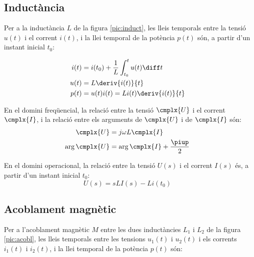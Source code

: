 \subsection{Inductància} 

Per a la inductància $L$ de la figura \vref{pic:induct},
les lleis temporals entre la tensió $u(t)$ i el corrent $i(t)$, i la llei temporal
de la potència $p(t)$ són,  a partir d'un instant inicial $t_0$:

\hfill
\begin{minipage}[b]{5cm}
	
	\label{pic:induct}
\end{minipage}
\hfill
\begin{minipage}[b][3.8cm][t]{8cm}
	\begin{align}
		i(t) &= i(t_0) + \frac{1}{L} \int_{t_0}^t u(t) \diff t \\
		u(t) &= L \deriv{i(t)}{t} \\
		p(t) &= u(t) i(t) = L i(t) \deriv{i(t)}{t}
	\end{align}
\end{minipage}

En el domini freqüencial, la relació entre la tensió $\cmplx{U}$ i el corrent $\cmplx{I}$, i la relació entre els arguments de $\cmplx{U}$ i de $\cmplx{I}$  són:
\begin{align}
	\cmplx{U} &= j \omega L \cmplx{I} \\
	\arg{\cmplx{U}} &= \arg{\cmplx{I}} + \frac{\piup}{2}
\end{align}

 En el domini operacional, la relació entre la tensió $U(s)$ i el corrent $I(s)$ és, a partir d'un instant inicial $t_0$:
\begin{equation}
	U(s) = s L I(s) - L i(t_0)
\end{equation}


\subsection{Acoblament magnètic}\label{sec:acobl-mag} 

Per a l'acoblament magnètic $M$ entre les dues
inductàncies $L_1$ i $L_2$ de la figura \vref{pic:acobl}, les lleis temporals entre les
tensions $u_1(t)$ i $u_2(t)$ i els corrents $i_1(t)$ i $i_2(t)$,  i la llei temporal
de la potència $p(t)$ són:

